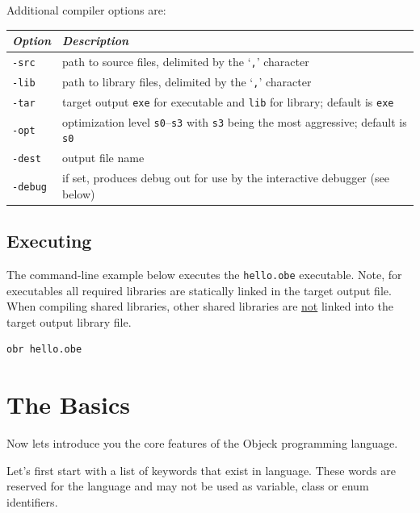 \documentclass[12pt]{article}
\begin{document}
Additional compiler options are:
\begin{center}
  \begin{tabular}{| l | l |}
    \hline
    \emph{Option} & \emph{Description} \\ \hline \hline
    \texttt{-src} & path to source files, delimited by the `\texttt{,}' character \\ \hline
    \texttt{-lib} & path to library files, delimited by the `\texttt{,}'
    character\\ \hline
    \texttt{-tar} & target output \texttt{exe} for executable and \texttt{lib} for library; default is  \texttt{exe} \\ \hline
    \texttt{-opt} & optimization level \texttt{s0}--\texttt{s3} with \texttt{s3} being the most aggressive; default is \texttt{s0} \\ \hline
    \texttt{-dest} & output file name \\ \hline
    \texttt{-debug} & if set, produces debug out for use by the interactive debugger (see below) \\ \hline
  \end{tabular}
\end{center}

\subsection{Executing}
The command-line example below executes the \texttt{hello.obe}
executable. Note, for executables all required libraries are
statically linked in the target output file.  When compiling shared
libraries, other shared libraries are \underline{not} linked into the
target output library file.

\begin{verbatim}
obr hello.obe
\end{verbatim}

\section{The Basics}
Now lets introduce you the core features of the Objeck programming
language.  \vspace{\baselineskip}

Let's first start with a list of keywords that exist in language.
These words are reserved for the language and may not be used as
variable, class or enum identifiers.
\end{document}
